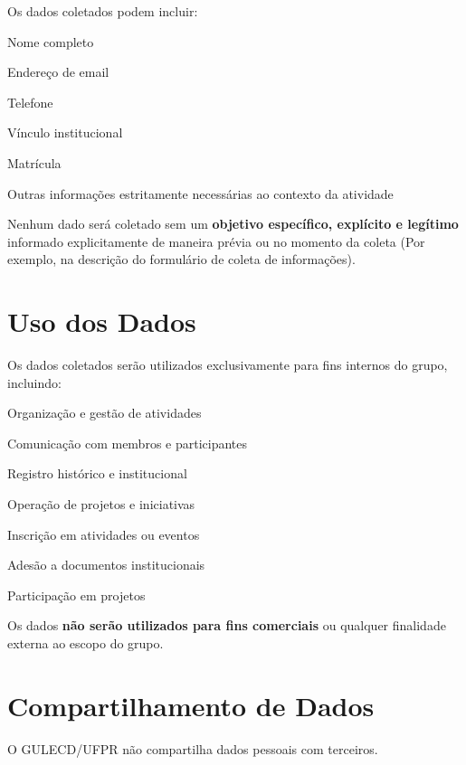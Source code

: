 \documentclass[
  12pt,          %
  a4paper,       %
  oneside,       %
  brazil         %
]{article}
\begin{document}
Os dados coletados podem incluir:

\begin{privacidade}
	\item Nome completo
	\item Endereço de email
	\item Telefone
	\item Vínculo institucional
	\item Matrícula
	\item Outras informações estritamente necessárias ao contexto da atividade
\end{privacidade}

Nenhum dado será coletado sem um \textbf{objetivo específico, explícito e legítimo} informado explicitamente de maneira prévia ou no momento da coleta 
(Por exemplo, na descrição do formulário de coleta de informações).

\section{Uso dos Dados}

Os dados coletados serão utilizados exclusivamente para fins internos do grupo, incluindo:

\begin{privacidade}
	\item Organização e gestão de atividades
	\item Comunicação com membros e participantes
	\item Registro histórico e institucional
	\item Operação de projetos e iniciativas
	\item Inscrição em atividades ou eventos
	\item Adesão a documentos institucionais
	\item Participação em projetos
\end{privacidade}

Os dados \textbf{não serão utilizados para fins comerciais} ou qualquer finalidade externa ao escopo do grupo.

\section{Compartilhamento de Dados}

O GULECD/UFPR não compartilha dados pessoais com terceiros.
\end{document}
